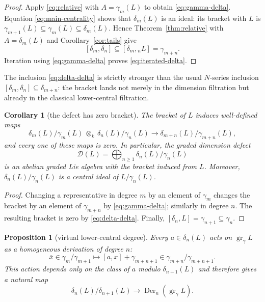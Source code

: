 \documentclass[a4paper,11pt,reqno]{amsart}
\newtheorem{proposition}[theorem]{Proposition}
\newtheorem{corollary}[theorem]{Corollary}
\theoremstyle{definition}
\theoremstyle{remark}
\newcommand{\dlt}{\delta}
\newcommand{\gm}{\gamma}
\newcommand{\Der}{\operatorname{Der}}
\newcommand{\gr}{\operatorname{gr}}
\begin{document}
\begin{proof}
Apply \eqref{eq:relative} with $A=\gm_m(L)$ to obtain
\eqref{eq:gamma-delta}.  Equation \eqref{eq:main-centrality} shows that
$\dlt_m(L)$ is an ideal: its bracket with $L$ is
$\gm_{m+1}(L)\subseteq\gm_m(L)\subseteq\dlt_m(L)$.  Hence
Theorem~\ref{thm:relative} with $A=\dlt_m(L)$ and
Corollary~\ref{cor:tails} give
\[
 [\dlt_m,\dlt_n]\subseteq[\dlt_m,{}_nL]=\gm_{m+n}.
\]
Iteration using \eqref{eq:gamma-delta} proves
\eqref{eq:iterated-delta}.
\end{proof}

The inclusion \eqref{eq:delta-delta} is strictly stronger than the usual
$N$-series inclusion $[\dlt_m,\dlt_n]\subseteq\dlt_{m+n}$: the bracket
lands not merely in the dimension filtration but already in the classical
lower-central filtration.

\begin{corollary}[the defect has zero bracket]\label{cor:square-zero}
The bracket of $L$ induces well-defined maps
\[
 \dlt_m(L)/\gm_m(L)\ \otimes_k\
 \dlt_n(L)/\gm_n(L)
 \longrightarrow \dlt_{m+n}(L)/\gm_{m+n}(L),
\]
and every one of these maps is zero.  In particular, the graded dimension
defect
\[
                 \mathcal D(L)=\bigoplus_{n\geq1}
                 \dlt_n(L)/\gm_n(L)
\]
is an abelian graded Lie algebra with the bracket induced from $L$.
Moreover, $\dlt_n(L)/\gm_n(L)$ is a central ideal of $L/\gm_n(L)$.
\end{corollary}

\begin{proof}
Changing a representative in degree $m$ by an element of $\gm_m$ changes
the bracket by an element of $\gm_{m+n}$ by
\eqref{eq:gamma-delta}; similarly in degree $n$.  The resulting bracket is
zero by \eqref{eq:delta-delta}.  Finally,
$[\dlt_n,L]=\gm_{n+1}\subseteq\gm_n$.
\end{proof}

\begin{proposition}[virtual lower-central degree]\label{prop:derivations}
Every $a\in\dlt_n(L)$ acts on $\gr_{\gm}L$ as a homogeneous derivation of
degree $n$:
\[
 \overline{x}\in\gm_m/\gm_{m+1}
 \longmapsto [a,x]+\gm_{m+n+1}\in\gm_{m+n}/\gm_{m+n+1}.
\]
This action depends only on the class of $a$ modulo $\dlt_{n+1}(L)$ and
therefore gives a natural map
\begin{equation}\label{eq:graded-derivation}
 \dlt_n(L)/\dlt_{n+1}(L)\longrightarrow
 \Der_n(\gr_{\gm}L).
\end{equation}
\end{proposition}
\end{document}
